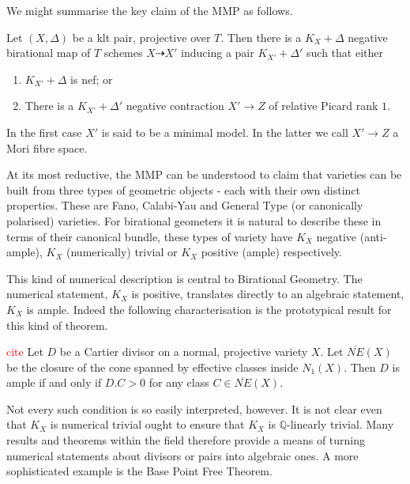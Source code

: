 \documentclass[a4paper,12pt]{book}
\newcommand\myworries[1]{\textcolor{red}{#1}}
\begin{document}
	We might summarise the key claim of the MMP as follows.
	
	\begin{conjecture*}
		Let $(X,\Delta)$ be a klt pair, projective over $T$. Then there is a $K_{X}+\Delta$ negative birational map of $T$ schemes $X \dashrightarrow X'$ inducing a pair $K_{X'}+\Delta'$ such that either
		
		\begin{enumerate}
			\item $K_{X'}+\Delta$ is nef; or
			\item There is a $K_{X'}+\Delta'$ negative contraction $X' \to Z$ of relative Picard rank $1$.
		\end{enumerate}
	\end{conjecture*}
	
	In the first case $X'$ is said to be a minimal model. In the latter we call $X' \to Z$ a Mori fibre space.
	
	At its most reductive, the MMP can be understood to claim that varieties can be built from three types of geometric objects - each with their own distinct properties. These are Fano, Calabi-Yau and General Type (or canonically polarised) varieties. For birational geometers it is natural to describe these in terms of their canonical bundle, these types of variety have $K_{X}$ negative (anti-ample), $K_{X}$ (numerically) trivial or $K_{X}$ positive (ample) respectively.
	
	This kind of numerical description is central to Birational Geometry. The numerical statement, $K_{X}$ is positive, translates directly to an algebraic statement, $K_{X}$ is ample. Indeed the following characterisation is the prototypical result for this kind of theorem.
	
	\begin{theorem*}\myworries{cite}
		Let $D$ be a Cartier divisor on a normal, projective variety $X$. Let $\overline{NE}(X)$ be the closure of the cone spanned by effective classes inside $N_{1}(X)$. Then $D$ is ample if and only if $D.C >0$ for any class $C \in \overline{NE}(X)$.
	\end{theorem*}
	
	Not every such condition is so easily interpreted, however. It is not clear even that $K_{X}$ is numerical trivial ought to ensure that $K_{X}$ is $\mathbb{Q}$-linearly trivial. Many results and theorems within the field therefore provide a means of turning numerical statements about divisors or pairs into algebraic ones. A more sophisticated example is the Base Point Free Theorem.
	
\end{document}
